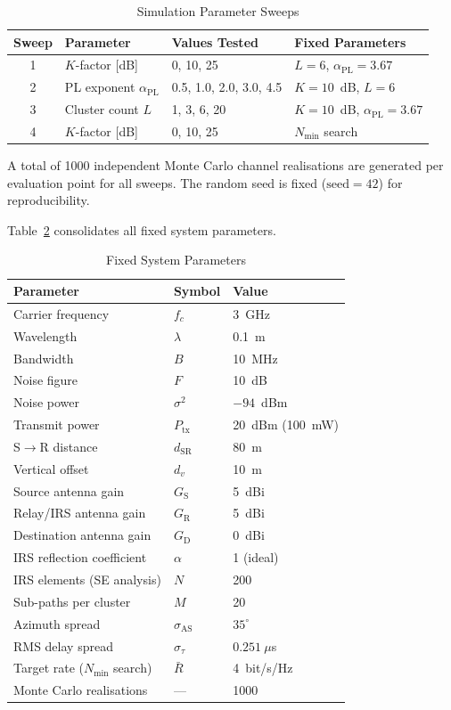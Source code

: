 \documentclass[journal]{IEEEtran} %
\begin{document}
\begin{table}[t]
\centering
\caption{Simulation Parameter Sweeps}
\label{tab:sweep_config}
\begin{tabular}{@{}clll@{}}
\toprule
Sweep & Parameter & Values Tested & Fixed Parameters \\
\midrule
1 & $K$-factor [dB] & 0, 10, 25 &
$L = 6$, $\alpha_{\mathrm{PL}} = 3.67$ \\

2 & PL exponent $\alpha_{\mathrm{PL}}$ &
0.5, 1.0, 2.0, 3.0, 4.5 &
$K = 10$~dB, $L = 6$ \\

3 & Cluster count $L$ &
1, 3, 6, 20 &
$K = 10$~dB, $\alpha_{\mathrm{PL}} = 3.67$ \\

4 & $K$-factor [dB] &
0, 10, 25 &
$N_{\mathrm{min}}$ search \\
\bottomrule
\end{tabular}
\end{table}

A total of 1000 independent Monte Carlo channel realisations are generated per evaluation point for all sweeps. The random seed is fixed ($\mathrm{seed} = 42$) for reproducibility.

Table~\ref{tab:system_params} consolidates all fixed system parameters.

\begin{table}[t]
\centering
\caption{Fixed System Parameters}
\label{tab:system_params}
\begin{tabular}{@{}lll@{}}
\toprule
Parameter & Symbol & Value \\
\midrule
Carrier frequency & $f_c$ & 3~GHz \\
Wavelength & $\lambda$ & 0.1~m \\
Bandwidth & $B$ & 10~MHz \\
Noise figure & $F$ & 10~dB \\
Noise power & $\sigma^2$ & $-94$~dBm \\
Transmit power & $P_{\mathrm{tx}}$ & 20~dBm (100~mW) \\
S$\to$R distance & $d_{\mathrm{SR}}$ & 80~m \\
Vertical offset & $d_v$ & 10~m \\
Source antenna gain & $G_{\mathrm{S}}$ & 5~dBi \\
Relay/IRS antenna gain & $G_{\mathrm{R}}$ & 5~dBi \\
Destination antenna gain & $G_{\mathrm{D}}$ & 0~dBi \\
IRS reflection coefficient & $\alpha$ & 1 (ideal) \\
IRS elements (SE analysis) & $N$ & 200 \\
Sub-paths per cluster & $M$ & 20 \\
Azimuth spread & $\sigma_{\mathrm{AS}}$ & $35^\circ$ \\
RMS delay spread & $\sigma_\tau$ & $0.251~\mu$s \\
Target rate ($N_{\mathrm{min}}$ search) & $\bar{R}$ & 4~bit/s/Hz \\
Monte Carlo realisations & --- & 1000 \\
\bottomrule
\end{tabular}
\end{table}
\end{document}
